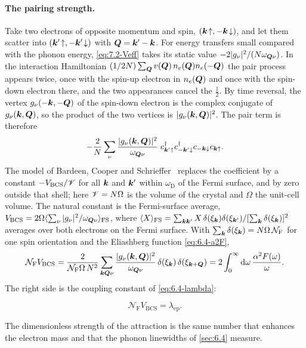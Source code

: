 \paragraph{The pairing strength.} Take two electrons of opposite momentum and spin, $(\bm{k}\!\uparrow, -\bm{k}\!\downarrow)$, and let them scatter into $(\bm{k}'\!\uparrow, -\bm{k}'\!\downarrow)$ with $\bm{Q} = \bm{k}' - \bm{k}$. For energy transfers small compared with the phonon energy, \cref{eq:7.2-Veff} takes its static value $-2|g_\nu|^2/(N\omega_{\bm{Q}\nu})$. In the interaction Hamiltonian $(1/2N)\sum_{\bm{Q}}v(\bm{Q})\,n_e(\bm{Q})n_e(-\bm{Q})$ the pair process appears twice, once with the spin-up electron in $n_e(\bm{Q})$ and once with the spin-down electron there, and the two appearances cancel the $\frac12$. By time reversal, the vertex $g_\nu(-\bm{k},-\bm{Q})$ of the spin-down electron is the complex conjugate of $g_\nu(\bm{k},\bm{Q})$, so the product of the two vertices is $|g_\nu(\bm{k},\bm{Q})|^2$. The pair term is therefore
\begin{equation*}
  -\frac{2}{N}\sum_\nu\frac{|g_\nu(\bm{k},\bm{Q})|^2}{\omega_{\bm{Q}\nu}}\;c^\dagger_{\bm{k}'\uparrow}c^\dagger_{-\bm{k}'\downarrow}c_{-\bm{k}\downarrow}c_{\bm{k}\uparrow} .
\end{equation*}
The model of Bardeen, Cooper and Schrieffer~\cite{bardeen1957theory} replaces the coefficient by a constant $-V_{\mathrm{BCS}}/\mathscr{V}$ for all $\bm{k}$ and $\bm{k}'$ within $\omega_{\mathrm{D}}$ of the Fermi surface, and by zero outside that shell; here $\mathscr{V} = N\Omega$ is the volume of the crystal and $\Omega$ the unit-cell volume. The natural constant is the Fermi-surface average, $V_{\mathrm{BCS}} = 2\Omega\langle\sum_\nu|g_\nu|^2/\omega_{\bm{Q}\nu}\rangle_{\mathrm{FS}}$, where $\langle X\rangle_{\mathrm{FS}} = \sum_{\bm{k}\bm{k}'}X\,\delta(\xi_{\bm{k}})\delta(\xi_{\bm{k}'})/[\sum_{\bm{k}}\delta(\xi_{\bm{k}})]^2$ averages over both electrons on the Fermi surface. With $\sum_{\bm{k}}\delta(\xi_{\bm{k}}) = N\Omega\,\mathcal{N}_{\mathrm{F}}$ for one spin orientation and the Eliashberg function \cref{eq:6.4-a2F},
\begin{equation*}
  \mathcal{N}_{\mathrm{F}}V_{\mathrm{BCS}} = \frac{2}{\mathcal{N}_{\mathrm{F}}\Omega\,N^2}\sum_{\bm{k}\bm{Q}\nu}\frac{|g_\nu(\bm{k},\bm{Q})|^2}{\omega_{\bm{Q}\nu}}\,\delta(\xi_{\bm{k}})\,\delta(\xi_{\bm{k}+\bm{Q}}) = 2\int_0^\infty\mathrm{d}\omega\,\frac{\alpha^2F(\omega)}{\omega} .
\end{equation*}
The right side is the coupling constant of \cref{eq:6.4-lambda}:
\begin{keyresult}
\begin{equation}
  \mathcal{N}_{\mathrm{F}}V_{\mathrm{BCS}} = \lambda_{\mathrm{ep}} .
  \label{eq:7.2-NV}
\end{equation}
\end{keyresult}
The dimensionless strength of the attraction is the same number that enhances the electron mass and that the phonon linewidths of \cref{sec:6.4} measure.

